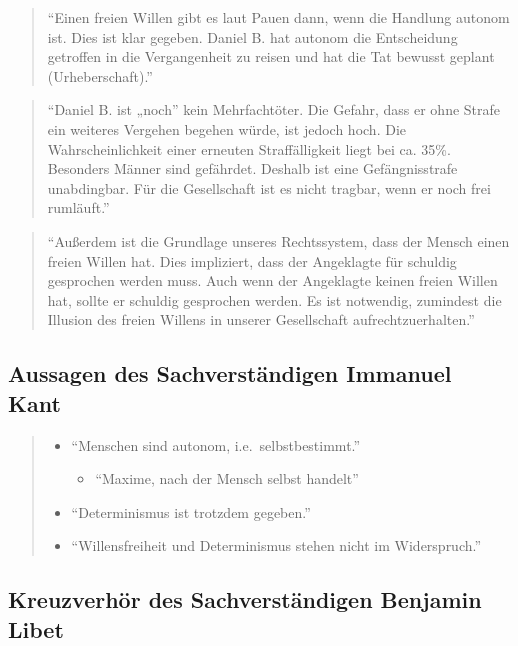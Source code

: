 \documentclass[
  a4paper,
]{report}
\providecommand{\tightlist}{%
  \setlength{\itemsep}{0pt}\setlength{\parskip}{0pt}}
\begin{document}
\begin{quote}
``Einen freien Willen gibt es laut Pauen dann, wenn die Handlung autonom ist. Dies ist klar gegeben. Daniel B. hat autonom die Entscheidung getroffen in die Vergangenheit zu reisen und hat die Tat bewusst geplant (Urheberschaft).''
\end{quote}

\begin{quote}
``Daniel B. ist „noch'' kein Mehrfachtöter. Die Gefahr, dass er ohne Strafe ein weiteres Vergehen begehen würde, ist jedoch hoch. Die Wahrscheinlichkeit einer erneuten Straffälligkeit liegt bei ca. 35\%. Besonders Männer sind gefährdet. Deshalb ist eine Gefängnisstrafe unabdingbar. Für die Gesellschaft ist es nicht tragbar, wenn er noch frei rumläuft.''
\end{quote}

\begin{quote}
``Außerdem ist die Grundlage unseres Rechtssystem, dass der Mensch einen freien Willen hat. Dies impliziert, dass der Angeklagte für schuldig gesprochen werden muss. Auch wenn der Angeklagte keinen freien Willen hat, sollte er schuldig gesprochen werden. Es ist notwendig, zumindest die Illusion des freien Willens in unserer Gesellschaft aufrechtzuerhalten.''
\end{quote}

\hypertarget{pr-expert-statement}{%
\subsection{Aussagen des Sachverständigen Immanuel Kant}\label{pr-expert-statement}}

\begin{quote}
\begin{itemize}
\item
  ``Menschen sind autonom, i.e.~selbstbestimmt.''

  \begin{itemize}
  \tightlist
  \item
    ``Maxime, nach der Mensch selbst handelt''
  \end{itemize}
\item
  ``Determinismus ist trotzdem gegeben.''
\item
  ``Willensfreiheit und Determinismus stehen nicht im Widerspruch.''
\end{itemize}
\end{quote}

\hypertarget{pr-expert-cross}{%
\subsection{Kreuzverhör des Sachverständigen Benjamin Libet}\label{pr-expert-cross}}
\end{document}
